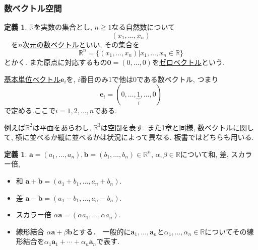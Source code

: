 \documentclass[dvipdfmx,a4paper,11pt]{article}
\newcommand{\R}{\mathbb{R}}
\theoremstyle{definition}
\newtheorem{dfn}[thm]{定義}
\begin{document}
\subsubsection{数ベクトル空間}
\begin{tcolorbox}[
    colback = white,
    colframe = green!35!black,
    fonttitle = \bfseries,
    breakable = true]
    \begin{dfn}
    \label{dfn-ei}
$\R$を実数の集合とし, $n \geqq1$なる自然数について
$$
(x_1, \ldots, x_n) 
$$
　を\underline{$n$次元の数ベクトル}といい, その集合を
$$
\R^n  = \{ (x_1, \ldots, x_n) | x_1, \ldots, x_n \in \R\}
$$
とかく. また原点に対応するもの$\bm{0}=(0, \ldots, 0)$を\underline{ゼロベクトル}という.

\underline{基本単位ベクトル}$\bm{e}_i$を, $i$番目のみ1で他は0である数ベクトル, つまり
$$
\bm{e}_i = (0, \ldots, \underbrace{1}_{i}, \ldots, 0)
$$
で定める.ここで$i=1,2,\ldots, n$である.
    \end{dfn}
 \end{tcolorbox}
 例えば$\R^2$は平面をあらわし, $\R^3$は空間を表す.
また1章と同様, 数ベクトルに関して, 横に並べるか縦に並べるかは状況によって異なる. 板書ではどちらも用いる.
     
\begin{tcolorbox}[
    colback = white,
    colframe = green!35!black,
    fonttitle = \bfseries,
    breakable = true]
    \begin{dfn}
$\bm{a}=(a_1, \ldots, a_n), \bm{b}=(b_1, \ldots, b_n)\in \R^n$, $\alpha, \beta \in \R$について和, 差, スカラー倍,
\begin{itemize}
 	\setlength{\parskip}{0cm}
  	\setlength{\itemsep}{0pt}
\item 和 $\bm{a} + \bm{b} = (a_1 + b_1, \ldots, a_n + b_n)$.
\item 差 $\bm{a} - \bm{b} = (a_1 - b_1, \ldots, a_n - b_n)$.
\item スカラー倍 $\alpha \bm{a} = (\alpha a_1, \ldots, \alpha a_n)$.
\item 線形結合 $\alpha \bm{a} + \beta \bm{b}$とする． 一般的に$\bm{a}_1, \ldots, \bm{a}_n$と$\alpha _1, \ldots, \alpha _n \in \R$についてその線形結合を$\alpha _1\bm{a}_1 + \cdots + \alpha _n\bm{a}_n $で表す.
\end{itemize}
    \end{dfn}
 \end{tcolorbox}
\end{document}
